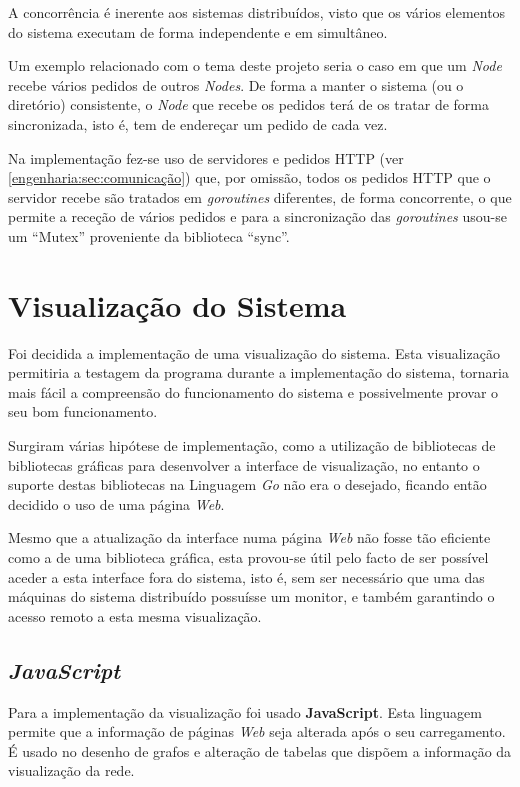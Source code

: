 A concorrência é inerente aos sistemas distribuídos, visto que os vários elementos do sistema executam de forma independente e em simultâneo.

Um exemplo relacionado com o tema deste projeto seria o caso em que um \emph{Node} recebe vários pedidos de outros \emph{Nodes}.
De forma a manter o sistema (ou o diretório) consistente,
o \emph{Node} que recebe os pedidos terá de os tratar de forma sincronizada, isto é, tem de endereçar um pedido de cada vez.

Na implementação fez-se uso de servidores e pedidos \acs{HTTP} (ver \ref{engenharia:sec:comunicação}) que, por omissão,
todos os pedidos \acs{HTTP} que o servidor recebe são tratados em \emph{goroutines} diferentes,
de forma concorrente, o que permite a receção de vários pedidos e 
para a sincronização das \emph{goroutines} usou-se um ``Mutex'' proveniente da biblioteca ``sync''.





\section{Visualização do Sistema}
Foi decidida a implementação de uma visualização do sistema. 
Esta visualização permitiria a testagem da programa durante a implementação do sistema,
tornaria mais fácil a compreensão do funcionamento do sistema e possivelmente provar o seu bom funcionamento.

Surgiram várias hipótese de implementação, como a utilização de bibliotecas de bibliotecas gráficas para desenvolver a interface de visualização,
no entanto o suporte destas bibliotecas na Linguagem \emph{Go} não era o desejado, ficando então decidido o uso de uma página \emph{Web}.

Mesmo que a atualização da interface numa página \emph{Web} não fosse tão eficiente como a de uma biblioteca gráfica, esta provou-se útil 
pelo facto de ser possível aceder a esta interface fora do sistema, isto é, sem ser necessário que uma das máquinas do sistema distribuído possuísse 
um monitor, e também garantindo o acesso remoto a esta mesma visualização.

\subsection*{\emph{JavaScript}}
Para a implementação da visualização foi usado \textbf{JavaScript}.
Esta linguagem permite que a informação de páginas \emph{Web} seja alterada após o seu carregamento.
É usado no desenho de grafos e alteração de tabelas que dispõem a informação da visualização da rede.

